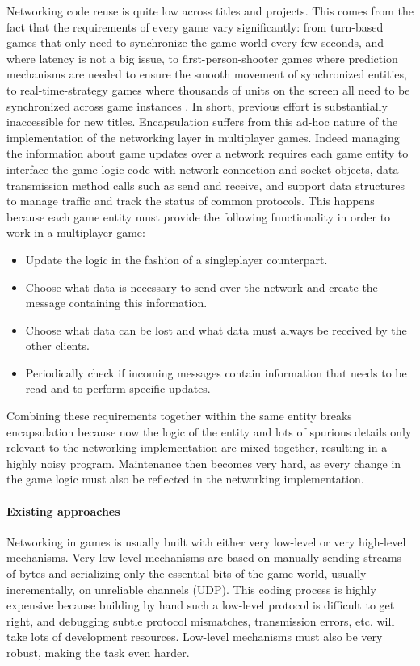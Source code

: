 Networking code reuse is quite low across titles and projects. This comes from the fact that the requirements of every game vary significantly: from turn-based games that only need to synchronize the game world every few seconds, and where latency is not a big issue, to first-person-shooter games where prediction mechanisms are needed to ensure the smooth movement of synchronized entities, to real-time-strategy games where thousands of units on the screen all need to be synchronized across game instances \cite{smed2002aspects}. In short, previous effort is substantially inaccessible for new titles. Encapsulation suffers from this ad-hoc nature of the implementation of the networking layer in multiplayer games. Indeed managing the information about game updates over a network requires each game entity to interface the game logic code with network connection and socket objects, data transmission method calls such as send and receive, and support data structures to manage traffic and track the status of common protocols. This happens because each game entity must provide the following functionality in order to work in a multiplayer game:

\begin{itemize}
	\item Update the logic in the fashion of a singleplayer counterpart.
	\item Choose what data is necessary to send over the network and create the message containing this information.
	\item Choose what data can be lost and what data must always be received by the other clients.
	\item Periodically check if incoming messages contain information that needs to be read and to perform specific updates.
\end{itemize}

Combining these requirements together within the same entity breaks encapsulation because now the logic of the entity and lots of spurious details only relevant to the networking implementation are mixed together, resulting in a highly noisy program. Maintenance then becomes very hard, as every change in the game logic must also be reflected in the networking implementation.

\paragraph{Existing approaches}
Networking in games is usually built with either very low-level or very high-level mechanisms. Very low-level mechanisms are based on manually sending streams of bytes and serializing only the essential bits of the game world, usually incrementally, on unreliable channels (UDP). This coding process is highly expensive because building by hand such a low-level protocol is difficult to get right, and debugging subtle protocol mismatches, transmission errors, etc. will take lots of development resources. Low-level mechanisms must also be very robust, making the task even harder.


